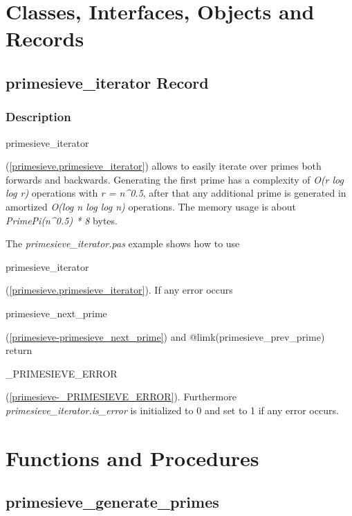 \documentclass{report}
\newif\ifpdf
\begin{document}
\section{Classes, Interfaces, Objects and Records}
\ifpdf
\subsection*{\large{\textbf{primesieve{\_}iterator Record}}\normalsize\hspace{1ex}\hrulefill}
\else
\subsection*{primesieve{\_}iterator Record}
\fi
\label{primesieve.primesieve_iterator}
\subsubsection*{\large{\textbf{Description}}\normalsize\hspace{1ex}\hfill}
\begin{ttfamily}primesieve{\_}iterator\end{ttfamily}(\ref{primesieve.primesieve_iterator}) allows to easily iterate over primes both forwards and backwards. Generating the first prime has a complexity of \textit{O(r log log r)} operations with \textit{r = n{\^{}}0.5}, after that any additional prime is generated in amortized \textit{O(log n log log n)} operations. The memory usage is about \textit{PrimePi(n{\^{}}0.5) * 8} bytes.

The \textit{primesieve{\_}iterator.pas} example shows how to use \begin{ttfamily}primesieve{\_}iterator\end{ttfamily}(\ref{primesieve.primesieve_iterator}). If any error occurs \begin{ttfamily}primesieve{\_}next{\_}prime\end{ttfamily}(\ref{primesieve-primesieve_next_prime}) and @limk(primesieve{\_}prev{\_}prime) return \begin{ttfamily}{\_}PRIMESIEVE{\_}ERROR\end{ttfamily}(\ref{primesieve-_PRIMESIEVE_ERROR}). Furthermore \textit{primesieve{\_}iterator.is{\_}error} is initialized to 0 and set to 1 if any error occurs.\section{Functions and Procedures}
\ifpdf
\subsection*{\large{\textbf{primesieve{\_}generate{\_}primes}}\normalsize\hspace{1ex}\hrulefill}
\else
\end{document}

